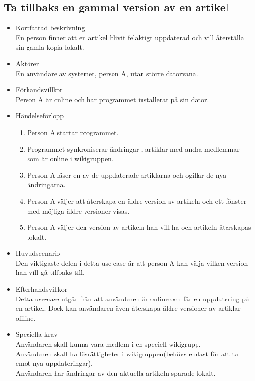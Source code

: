 \subsection{Ta tillbaks en gammal version av en artikel}
\begin{itemize}
	\item Kortfattad beskrivning
	\\En person finner att en artikel blivit felaktigt uppdaterad och vill återställa sin gamla kopia lokalt.
	\item Aktörer
	\\En användare av systemet, person A, utan större datorvana.
	\item Förhandsvillkor
	\\Person A är online och har programmet installerat på sin dator.
	\item Händelseförlopp
	\begin{enumerate}
		\item Person A startar programmet.
		\item Programmet synkroniserar ändringar i artiklar med andra medlemmar som är online i wikigruppen.
		\item Person A läser en av de uppdaterade artiklarna och ogillar de nya ändringarna.
		\item Person A väljer att återskapa en äldre version av artikeln och ett fönster med möjliga äldre versioner visas.
		\item Person A väljer den version av artikeln han vill ha och artikeln återskapas lokalt.
	\end{enumerate}	
	\item Huvudscenario
	\\Den viktigaste delen i detta use-case är att person A kan välja vilken version han vill gå tillbaks till.
	\item Efterhandsvillkor
	\\Detta use-case utgår från att användaren är online och får en uppdatering på en artikel. Dock kan användaren även återskapa äldre versioner av artiklar offline.
	\item Speciella krav
	\\Användaren skall kunna vara medlem i en speciell wikigrupp.
	\\Användaren skall ha läsrättigheter i wikigruppen(behövs endast för att ta emot nya uppdateringar).
	\\Användaren har ändringar av den aktuella artikeln sparade lokalt.
\end{itemize}


